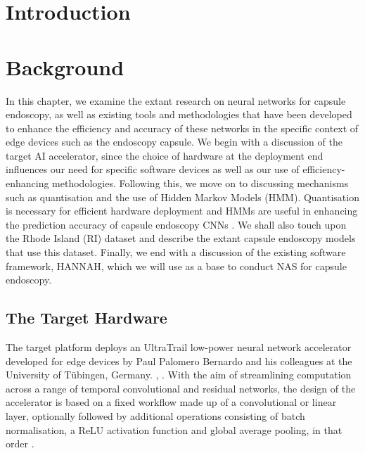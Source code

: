 \documentclass[11pt,a4paper, open=any]{scrbook}
\begin{document}
\tableofcontents

\chapter{Introduction}\label{ch:intro}

\chapter{Background}\label{ch:2}
In this chapter, we examine the extant research on neural networks for capsule endoscopy, as well as existing tools and methodologies that have been developed to enhance the efficiency and accuracy of these  networks in the specific context of edge devices such as the endoscopy capsule. We begin with a discussion of the target AI accelerator, since the choice of hardware at the deployment end influences our need for specific software devices as well as our use of efficiency-enhancing methodologies. Following this, we move on to discussing mechanisms such as quantisation and the use of Hidden Markov Models (HMM). Quantisation is necessary for efficient hardware deployment \cite[3]{bernardo20} and HMMs are useful in enhancing the prediction accuracy of capsule endoscopy CNNs \cite{werner23}. We shall also touch upon the Rhode Island (RI) dataset and describe the extant capsule endoscopy models that use this dataset. Finally, we end with a discussion of the existing software framework, HANNAH, which we will use as a base to conduct NAS for capsule endoscopy.


\section{The Target Hardware}
The target platform deploys an UltraTrail low-power neural network accelerator developed for edge devices by Paul Palomero Bernardo and his colleagues at the University of Tübingen, Germany. \cite{bernardo20}, \cite{bernardo25}. With the aim of streamlining computation across a range of temporal convolutional and residual networks, the design of the accelerator is based on a fixed workflow made up of a convolutional or linear layer, optionally followed by additional operations consisting of batch normalisation, a ReLU activation function and global average pooling, in that order \cite[6]{bernardo20}.
\end{document}
